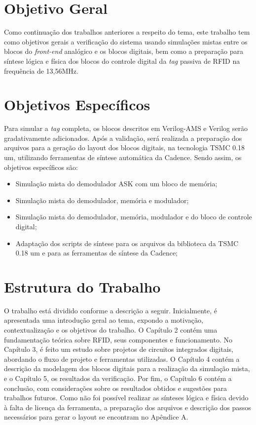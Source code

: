 \section{Objetivo Geral}

Como continuação dos trabalhos anteriores a respeito do tema, este trabalho tem como objetivos gerais a verificação do sistema usando simulações mistas entre os blocos do \textit{front-end} analógico e os blocos digitais, bem como a preparação para síntese lógica e física dos blocos do controle digital da \textit{tag} passiva de RFID na frequência de 13,56MHz.

\section{Objetivos Específicos}

Para simular a \textit{tag} completa, os blocos descritos em Verilog-AMS e Verilog serão gradativamente adicionados. Após a validação, será realizada a preparação dos arquivos para a geração do layout dos blocos digitais, na tecnologia TSMC 0.18 um, utilizando ferramentas de síntese automática da Cadence. Sendo assim, os objetivos específicos são:

\begin{itemize}

\item Simulação mista do demodulador ASK com um bloco de memória;
\item Simulação mista do demodulador, memória e modulador;
\item Simulação mista do demodulador, memória, modulador e do bloco de controle digital;
\item Adaptação dos scripts de síntese para os arquivos da biblioteca da TSMC 0.18 um e para as ferramentas de síntese da Cadence;
\end{itemize}

\section{Estrutura do Trabalho}

O trabalho está dividido conforme a descrição a seguir. Inicialmente, é apresentada uma introdução geral ao tema, expondo a motivação, contextualização e os objetivos do trabalho. O Capítulo 2 contém uma fundamentação teórica sobre RFID, seus componentes e funcionamento. No Capítulo 3, é feito um estudo sobre projetos de circuitos integrados digitais, abordando o fluxo de projeto e ferramentas utilizadas. O Capítulo 4 contém a descrição da modelagem dos blocos digitais para a realização da simulação mista, e o Capítulo 5, os resultados da verificação. Por fim, o Capítulo 6 contém a conclusão, com considerações sobre os resultados obtidos e sugestões para trabalhos futuros. Como não foi possível realizar as sínteses lógica e física devido à falta de licença da ferramenta, a preparação dos arquivos e descrição dos passos necessários para gerar o layout se encontram no Apêndice A.

